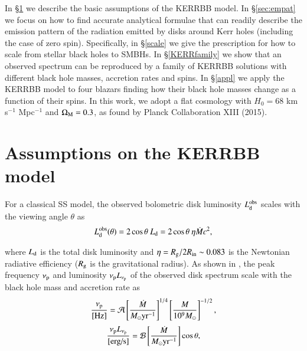 \documentclass{aa}
\begin{document}
In \S \ref{sec:basic} we describe the basic assumptions of the KERRBB model. In \S \ref{sec:empat} we focus on how to find accurate analytical formulae that can readily describe the emission pattern of the radiation emitted by disks around Kerr holes (including the case of zero spin). Specifically, in \S \ref{scale} we give the prescription for how to scale from stellar black holes to SMBHs. In \S \ref{KERRfamily} we show that an observed spectrum can be reproduced by a family of KERRBB solutions with different black hole masses, accretion rates and spins. In \S \ref{appl} we apply the KERRBB model to four blazars finding how their black hole masses change as a function of their spins. In this work, we adopt a flat cosmology with $H_0=68$ km s$^{-1}$ Mpc$^{-1}$ and $\Omega_{\rm M}=0.3$, as found by Planck Collaboration XIII (2015). 








\section{Assumptions on the KERRBB model} \label{sec:basic}

For a classical SS model, the observed bolometric disk luminosity $L^{\rm obs}_{\rm d}$ scales with the viewing angle $\theta$ as
	\begin{equation} \label{SSobslum}
		L^{\rm obs}_{\rm d} (\theta) = 2 \cos \theta\ L_{\rm d} = 2 \cos \theta\ \eta \dot{M} c^2,
	\end{equation}

\noindent where $L_{\rm d}$ is the total disk luminosity and $\eta =R_{\rm g} / 2 R_{\rm in}\sim 0.083$ is the Newtonian radiative efficiency ($R_{\rm g}$ is the gravitational radius). As shown in \citet{Caldero}, the peak frequency $\nu_{\rm p}$ and luminosity $\nu_{\rm p} L_{\nu_{\rm p}}$ of the observed disk spectrum scale with the black hole mass and accretion rate as
	\begin{equation} \label{eq:nupeak}
		\frac{\nu_{\rm p}}{\text{[Hz]}} = \mathcal{A} \left[ \frac{\dot{M}}{M_{\odot}
\text{yr}^{-1}} \right]^{1/4} \left[ \frac{M}{10^9 M_{\odot}} \right]^{-1/2},
	\end{equation}
	\begin{equation} \label{eq:nulnupeak}
		\frac{\nu_{\rm p} L_{\nu_{\rm p}}}{\text{[erg/s]}} = \mathcal{B} 
\left[ \frac{\dot{M}}{M_{\odot} \text{yr}^{-1}} \right] \cos \theta,
	\end{equation}
\end{document}
